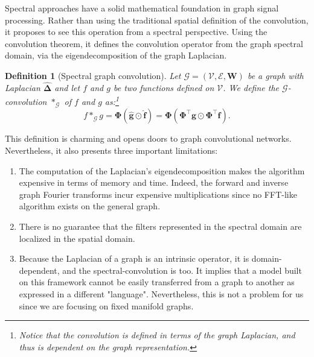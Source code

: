 \documentclass{article}
\newtheorem{definition}{Definition}[section]
\begin{document}
Spectral approaches have a solid mathematical foundation in graph signal processing. Rather than using the traditional spatial definition of the convolution, it proposes to see this operation from a spectral perspective. Using the convolution theorem, it defines the convolution operator from the graph spectral domain, via the eigendecomposition of the graph Laplacian.

\begin{definition}[Spectral graph convolution]
Let $\mathcal{G} = (\mathcal{V}, \mathcal{E}, \boldsymbol{W})$ be a graph with Laplacian $\boldsymbol{\hat{\Delta}}$ and let $f$ and $g$ be two functions defined on $\mathcal{V}$. We define the $\mathcal{G}$-convolution $*_{\mathcal{G}}$ of $f$ and $g$ as:\footnote{Notice that the convolution is defined in terms of the graph Laplacian, and thus is dependent on the graph representation.}
\begin{equation}
f *_{\mathcal{G}} g = \boldsymbol{\Phi} (\boldsymbol{\hat{g}} \odot \boldsymbol{\hat{f}}) = \boldsymbol{\Phi} (\boldsymbol{\Phi}^{\top} \boldsymbol{g} \odot \boldsymbol{\Phi}^{\top} \boldsymbol{f}).
\end{equation}
\end{definition}

This definition is charming and opens doors to graph convolutional networks. Nevertheless, it also presents three important limitations:
\begin{enumerate}
    \item The computation of the Laplacian's eigendecomposition makes the algorithm expensive in terms of memory and time. Indeed, the forward and inverse graph Fourier transforms incur expensive multiplications since no FFT-like algorithm exists on the general graph.
    \item There is no guarantee that the filters represented in the spectral domain are localized in the spatial domain.
    \item Because the Laplacian of a graph is an intrinsic operator, it is domain-dependent, and the spectral-convolution is too. It implies that a model built on this framework cannot be easily transferred from a graph to another as expressed in a different "language". Nevertheless, this is not a problem for us since we are focusing on fixed manifold graphs.
\end{enumerate}
\end{document}
